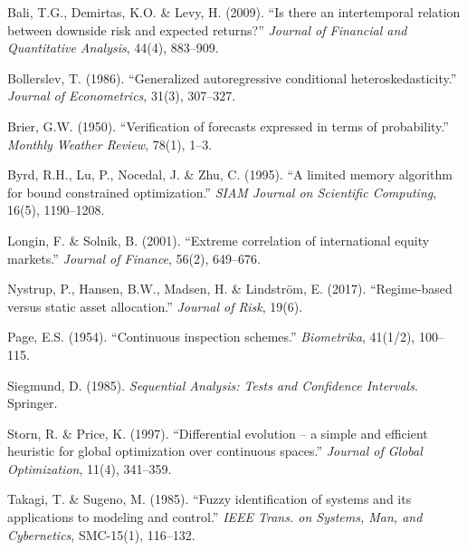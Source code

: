 \documentclass[11pt,a4paper]{article}
\begin{document}
\begin{enumerate}[label={[\arabic*]},nosep]
  \item Bali, T.G., Demirtas, K.O. \& Levy, H. (2009). ``Is there an intertemporal relation between downside risk and expected returns?'' \textit{Journal of Financial and Quantitative Analysis}, 44(4), 883--909.
  \item Bollerslev, T. (1986). ``Generalized autoregressive conditional heteroskedasticity.'' \textit{Journal of Econometrics}, 31(3), 307--327.
  \item Brier, G.W. (1950). ``Verification of forecasts expressed in terms of probability.'' \textit{Monthly Weather Review}, 78(1), 1--3.
  \item Byrd, R.H., Lu, P., Nocedal, J. \& Zhu, C. (1995). ``A limited memory algorithm for bound constrained optimization.'' \textit{SIAM Journal on Scientific Computing}, 16(5), 1190--1208.
  \item Longin, F. \& Solnik, B. (2001). ``Extreme correlation of international equity markets.'' \textit{Journal of Finance}, 56(2), 649--676.
  \item Nystrup, P., Hansen, B.W., Madsen, H. \& Lindstr\"{o}m, E. (2017). ``Regime-based versus static asset allocation.'' \textit{Journal of Risk}, 19(6).
  \item Page, E.S. (1954). ``Continuous inspection schemes.'' \textit{Biometrika}, 41(1/2), 100--115.
  \item Siegmund, D. (1985). \textit{Sequential Analysis: Tests and Confidence Intervals}. Springer.
  \item Storn, R. \& Price, K. (1997). ``Differential evolution -- a simple and efficient heuristic for global optimization over continuous spaces.'' \textit{Journal of Global Optimization}, 11(4), 341--359.
  \item Takagi, T. \& Sugeno, M. (1985). ``Fuzzy identification of systems and its applications to modeling and control.'' \textit{IEEE Trans. on Systems, Man, and Cybernetics}, SMC-15(1), 116--132.
\end{enumerate}
\end{document}
